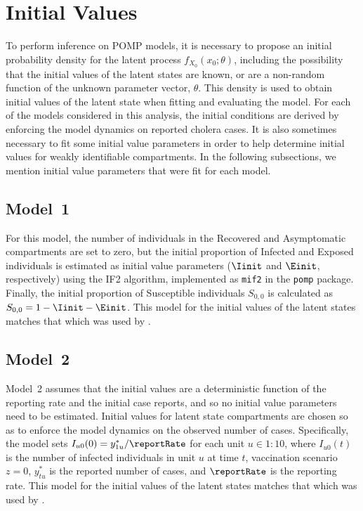\section{Initial Values}

To perform inference on POMP models, it is necessary to propose an initial probability density for the latent process $f_{X_0}(x_0;\theta)$, including the possibility that the initial values of the latent states are known, or are a non-random function of the unknown parameter vector, $\theta$.
This density is used to obtain initial values of the latent state when fitting and evaluating the model.
For each of the models considered in this analysis, the initial conditions are derived by enforcing the model dynamics on reported cholera cases.
It is also sometimes necessary to fit some initial value parameters in order to help determine initial values for weakly identifiable compartments.
In the following subsections, we mention initial value parameters that were fit for each model.

\subsection{Model~1}

For this model, the number of individuals in the Recovered and Asymptomatic compartments are set to zero, but the initial proportion of Infected and Exposed individuals is estimated as initial value parameters ($\Iinit$ and $\Einit$, respectively) using the IF2 algorithm, implemented as \texttt{mif2} in the \texttt{pomp} package.
Finally, the initial proportion of Susceptible individuals $S_{0, 0}$ is calculated as $S_{0, 0} = 1 - \Iinit - \Einit$.
This model for the initial values of the latent states matches that which was used by \citet{lee20}.

\subsection{Model~2}

Model~2 assumes that the initial values are a deterministic function of the reporting rate and the initial case reports, and so no initial value parameters need to be estimated.
Initial values for latent state compartments are chosen so as to enforce the model dynamics on the observed number of cases.
Specifically, the model sets $I_{u0}(0) = y^*_{1u} / \reportRate$ for each unit $u \in 1:10$, where $I_{u0}(t)$ is the number of infected individuals in unit $u$ at time $t$, vaccination scenario $z = 0$, $y^*_{tu}$ is the reported number of cases, and $\reportRate$ is the reporting rate.
This model for the initial values of the latent states matches that which was used by \citet{lee20}.

